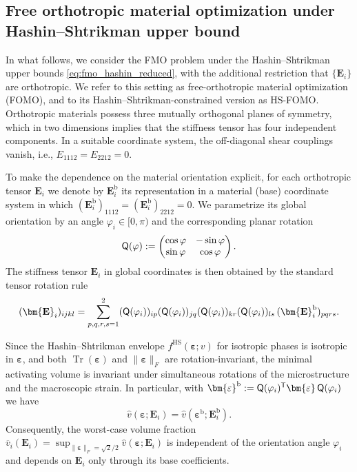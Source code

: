 \documentclass[preprint,3p]{elsarticle}
\newcommand{\tenss}[1]{\bm{\mathbf{#1}}}            %
\newcommand{\tensf}[1]{\bm{\mathbf{#1}}}            %
\newcommand{\trn}{\mathsf{T}}                       %
\newcommand{\strain}{\tenss{\varepsilon}}           %
\newcommand{\Ei}{\tensf{E}_i}                       %
\newcommand{\semtrx}[1]{\ifcat\noexpand#1\relax\bm{#1}\else\mathsf{#1}\fi}
\newcommand{\Tr}{\operatorname{Tr}}
\begin{document}
\subsection{Free orthotropic material optimization under Hashin--Shtrikman upper bound}\label{sec:fmo_ortho}

In what follows, we consider the FMO problem under the Hashin--Shtrikman upper bounds \eqref{eq:fmo_hashin_reduced}, with the additional restriction that $\{\Ei\}$ are orthotropic. We refer to this setting as free-orthotropic material optimization (FOMO), and to its Hashin--Shtrikman-constrained version as HS-FOMO. Orthotropic materials possess three mutually orthogonal planes of symmetry, which in two dimensions implies that the stiffness tensor has four independent components. In a suitable coordinate system, the off-diagonal shear couplings vanish, i.e., $E_{1112} = E_{2212} = 0$.

To make the dependence on the material orientation explicit, for each orthotropic tensor $\Ei$ we denote by $\Ei^{\mathrm{b}}$ its representation in a material (base) coordinate system in which $(\Ei^{\mathrm{b}})_{1112}=(\Ei^{\mathrm{b}})_{2212}=0$. We parametrize its global orientation by an angle $\varphi_i\in[0,\pi)$ and the corresponding planar rotation
%
\begin{equation}\label{eq:rot_matrix_2d}
    \semtrx{Q}(\varphi):=
    \begin{pmatrix}
        \cos\varphi & -\sin\varphi\\
        \sin\varphi & \cos\varphi
    \end{pmatrix}.
\end{equation}
%
The stiffness tensor $\Ei$ in global coordinates is then obtained by the standard tensor rotation rule
%
\begin{equation}\label{eq:ortho_tensor_rotation}
    (\Ei)_{ijkl}=\sum_{p,q,r,s=1}^2 (\semtrx{Q}(\varphi_i))_{ip}(\semtrx{Q}(\varphi_i))_{jq}(\semtrx{Q}(\varphi_i))_{kr}(\semtrx{Q}(\varphi_i))_{ls}\,(\Ei^{\mathrm{b}})_{pqrs}.
\end{equation}

Since the Hashin--Shtrikman envelope $f^{\mathrm{HS}}(\strain;v)$ for isotropic phases is isotropic in $\strain$, and both $\Tr(\strain)$ and $\lVert\strain\rVert_F$ are rotation-invariant, the minimal activating volume is invariant under simultaneous rotations of the microstructure and the macroscopic strain. In particular, with $\strain^{\mathrm{b}}:=\semtrx{Q}(\varphi_i)^\trn \strain\,\semtrx{Q}(\varphi_i)$ we have
%
\begin{equation}\label{eq:hatv_rotation_invariance}
    \hat{v}(\strain;\Ei)=\hat{v}(\strain^{\mathrm{b}};\Ei^{\mathrm{b}}).
\end{equation}
%
Consequently, the worst-case volume fraction $\overline{v}_i(\Ei)=\sup_{\lVert\strain\rVert_F=\sqrt{2}/2}\hat{v}(\strain;\Ei)$ is independent of the orientation angle $\varphi_i$ and depends on $\Ei$ only through its base coefficients.
\end{document}
